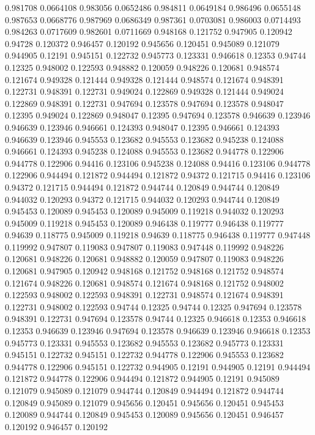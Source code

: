 0.981708 0.0664108
0.983056 0.0652486
0.984811 0.0649184
0.986496 0.0655148
0.987653 0.0668776
0.987969 0.0686349
0.987361 0.0703081
0.986003 0.0714493
0.984263 0.0717609
0.982601 0.0711669
0.948168 0.121752
0.947905 0.120942
0.94728 0.120372
0.946457 0.120192
0.945656 0.120451
0.945089 0.121079
0.944905 0.12191
0.945151 0.122732
0.945773 0.123331
0.946618 0.12353
0.94744 0.12325
0.948002 0.122593
0.948882 0.120059
0.948226 0.120681
0.948574 0.121674
0.949328 0.121444
0.949328 0.121444
0.948574 0.121674
0.948391 0.122731
0.948391 0.122731
0.949024 0.122869
0.949328 0.121444
0.949024 0.122869
0.948391 0.122731
0.947694 0.123578
0.947694 0.123578
0.948047 0.12395
0.949024 0.122869
0.948047 0.12395
0.947694 0.123578
0.946639 0.123946
0.946639 0.123946
0.946661 0.124393
0.948047 0.12395
0.946661 0.124393
0.946639 0.123946
0.945553 0.123682
0.945553 0.123682
0.945238 0.124088
0.946661 0.124393
0.945238 0.124088
0.945553 0.123682
0.944778 0.122906
0.944778 0.122906
0.94416 0.123106
0.945238 0.124088
0.94416 0.123106
0.944778 0.122906
0.944494 0.121872
0.944494 0.121872
0.94372 0.121715
0.94416 0.123106
0.94372 0.121715
0.944494 0.121872
0.944744 0.120849
0.944744 0.120849
0.944032 0.120293
0.94372 0.121715
0.944032 0.120293
0.944744 0.120849
0.945453 0.120089
0.945453 0.120089
0.945009 0.119218
0.944032 0.120293
0.945009 0.119218
0.945453 0.120089
0.946438 0.119777
0.946438 0.119777
0.94639 0.118775
0.945009 0.119218
0.94639 0.118775
0.946438 0.119777
0.947448 0.119992
0.947807 0.119083
0.947807 0.119083
0.947448 0.119992
0.948226 0.120681
0.948226 0.120681
0.948882 0.120059
0.947807 0.119083
0.948226 0.120681
0.947905 0.120942
0.948168 0.121752
0.948168 0.121752
0.948574 0.121674
0.948226 0.120681
0.948574 0.121674
0.948168 0.121752
0.948002 0.122593
0.948002 0.122593
0.948391 0.122731
0.948574 0.121674
0.948391 0.122731
0.948002 0.122593
0.94744 0.12325
0.94744 0.12325
0.947694 0.123578
0.948391 0.122731
0.947694 0.123578
0.94744 0.12325
0.946618 0.12353
0.946618 0.12353
0.946639 0.123946
0.947694 0.123578
0.946639 0.123946
0.946618 0.12353
0.945773 0.123331
0.945553 0.123682
0.945553 0.123682
0.945773 0.123331
0.945151 0.122732
0.945151 0.122732
0.944778 0.122906
0.945553 0.123682
0.944778 0.122906
0.945151 0.122732
0.944905 0.12191
0.944905 0.12191
0.944494 0.121872
0.944778 0.122906
0.944494 0.121872
0.944905 0.12191
0.945089 0.121079
0.945089 0.121079
0.944744 0.120849
0.944494 0.121872
0.944744 0.120849
0.945089 0.121079
0.945656 0.120451
0.945656 0.120451
0.945453 0.120089
0.944744 0.120849
0.945453 0.120089
0.945656 0.120451
0.946457 0.120192
0.946457 0.120192
